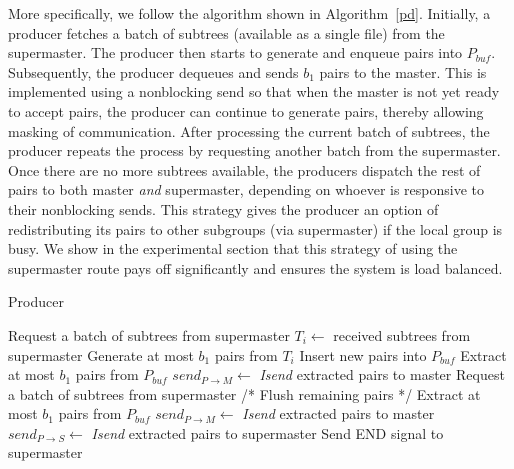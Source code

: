 \documentclass[10pt,journal,letterpaper,compsoc]{IEEEtran}
\begin{document}
More specifically,  we follow the algorithm shown in Algorithm~\ref{pd}. Initially, a producer fetches a batch of subtrees (available as a single file) from the supermaster. The producer then starts to generate and enqueue pairs into $P_{buf}$. Subsequently, the producer dequeues and sends $b_1$ pairs to the master. This is implemented using a nonblocking send so that when the master is not yet ready to accept pairs, the producer can continue to generate pairs, thereby allowing masking of communication. After processing the current batch of subtrees, the producer repeats the process by requesting another batch from the supermaster. Once there are no more subtrees available, the producers dispatch the rest of pairs to both master \emph{and} supermaster, depending on whoever is responsive to their nonblocking sends. This strategy gives the producer an option of redistributing its pairs to other subgroups (via supermaster) if the local group is busy. We show in the experimental section that this strategy of using the supermaster route pays off significantly and ensures the system is load balanced. \\

\begin{algorithm}
\caption{Producer}
\label{pd}
\begin{algorithmic}[1]
    \STATE Request a batch of subtrees from supermaster
    \WHILE{\TRUE}
        \STATE $T_i \leftarrow$ received subtrees from supermaster 
        \ELSE
        	\REPEAT
                		\STATE Generate at most $b_1$ pairs from $T_i$
                		\STATE Insert new pairs into $P_{buf}$
            		\ENDIF
                	\STATE Extract at most $b_1$ pairs from $P_{buf}$
                	\STATE $send_{P\rightarrow M}\leftarrow$ {\it Isend} extracted pairs to master
            	\ENDIF
        	\STATE Request a batch of subtrees from supermaster
	\ENDIF
    \ENDWHILE
    \STATE /* Flush remaining pairs */
        \STATE Extract at most $b_1$ pairs from $P_{buf}$
            \STATE $send_{P\rightarrow M}\leftarrow$ {\it Isend} extracted pairs to master
        \ENDIF
            \STATE $send_{P\rightarrow S}\leftarrow$ {\it Isend} extracted pairs to supermaster
        \ENDIF
    \ENDWHILE
    \STATE Send END signal to supermaster
\end{algorithmic}
\end{algorithm}
\end{document}
